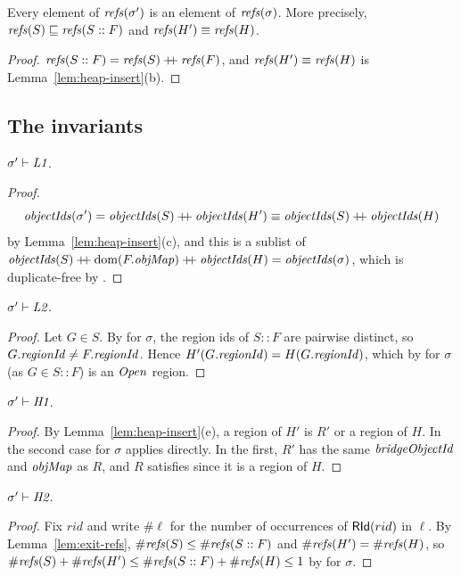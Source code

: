 \begin{lemma}
\label{lem:exit-refs}
Every element of $\mathit{refs}(\sigma')$ is an element of $\mathit{refs}(\sigma)$. More precisely,
$\mathit{refs}(S) \sqsubseteq \mathit{refs}(S :: F)$ and $\mathit{refs}(H') \equiv \mathit{refs}(H)$.
\end{lemma}
\begin{proof}
$\mathit{refs}(S :: F) = \mathit{refs}(S) \mathbin{+\!\!+} \mathit{refs}(F)$, and $\mathit{refs}(H') \equiv \mathit{refs}(H)$ is
Lemma~\ref{lem:heap-insert}(b).
\end{proof}

\subsection{The invariants}

\begin{lemma}[\inv{L1}] 
$\sigma' \vdash \textit{L1}$.
\end{lemma}
\begin{proof}
\[ \mathit{objectIds}(\sigma') = \mathit{objectIds}(S) \mathbin{+\!\!+} \mathit{objectIds}(H') \equiv \mathit{objectIds}(S) \mathbin{+\!\!+} \mathit{objectIds}(H) \]
by
Lemma~\ref{lem:heap-insert}(c), and this is a sublist of
$\mathit{objectIds}(S) \mathbin{+\!\!+} \mathrm{dom}(F.\mathit{objMap}) \mathbin{+\!\!+} \mathit{objectIds}(H) = \mathit{objectIds}(\sigma)$, which is duplicate-free by .
\end{proof}

\begin{lemma}[\inv{L2}] 
$\sigma' \vdash \textit{L2}$.
\end{lemma}
\begin{proof}
Let $G \in S$. By  for $\sigma$, the region ids of $S :: F$ are pairwise distinct, so
$G.\mathit{regionId} \ne F.\mathit{regionId}$. Hence $H'(G.\mathit{regionId}) = H(G.\mathit{regionId})$, which by  for $\sigma$ (as
$G \in S :: F$) is an $\mathit{Open}$ region.
\end{proof}

\begin{lemma}[\inv{H1}] 
$\sigma' \vdash \textit{H1}$.
\end{lemma}
\begin{proof}
By Lemma~\ref{lem:heap-insert}(e), a region of $H'$ is $R'$ or a region of $H$. In the second case
 for $\sigma$ applies directly. In the first, $R'$ has the same $\mathit{bridgeObjectId}$ and $\mathit{objMap}$ as $R$,
and $R$ satisfies  since it is a region of $H$.
\end{proof}

\begin{lemma}[\inv{H2}] 
$\sigma' \vdash \textit{H2}$.
\end{lemma}
\begin{proof}
Fix $rid$ and write $\#\ell$ for the number of occurrences of $\mathsf{RId}(rid)$ in $\ell$. By
Lemma~\ref{lem:exit-refs}, $\#\mathit{refs}(S) \le \#\mathit{refs}(S :: F)$ and $\#\mathit{refs}(H') = \#\mathit{refs}(H)$, so
$\#\mathit{refs}(S) + \#\mathit{refs}(H') \le \#\mathit{refs}(S :: F) + \#\mathit{refs}(H) \le 1$ by  for $\sigma$.
\end{proof}

